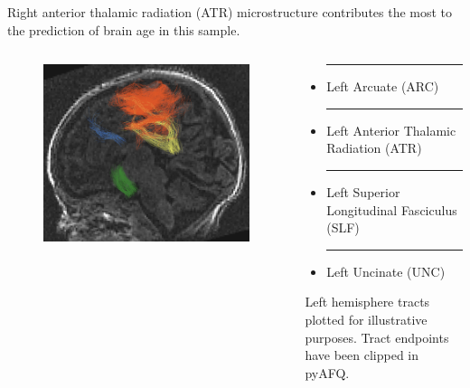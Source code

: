 \documentclass[final]{beamer}
\newlength{\colwidth}
\begin{document}
\begin{frame}[t]
\begin{columns}[t]
\begin{column}{\colwidth}
\begin{block}{Right anterior thalamic radiation (ATR) microstructure contributes the most to the prediction of brain age in this sample.}
    
    \begin{columns}[t] %
        \begin{column}{0.53\textwidth}
            \vspace{-10pt}
            \begin{figure} %
            \centering  \includegraphics[clip,width=\textwidth]{brain_2.png}
            \end{figure}
      \end{column}
    
      \begin{column}{0.46\textwidth}
        \vspace{-10pt}
        \begin{tcolorbox}[colback=gray!50, colframe=cardinalred, width=\linewidth]
          {\fontsize{9.5}{10}\selectfont
          \begin{itemize}
            \item \textcolor[rgb]{1.0, 1.0, 0.4}{\rule{0.8cm}{0.3cm}} Left Arcuate (ARC)
            \item \textcolor[rgb]{0.2, 0.4, 0.6}{\rule{0.8cm}{0.3cm}} Left Anterior Thalamic Radiation (ATR) 
            \item \textcolor[rgb]{1.0, 0.4, 0.0}{\rule{0.8cm}{0.3cm}} Left Superior Longitudinal Fasciculus (SLF) 
            \item \textcolor[rgb]{0.0, 0.6, 0.2}{\rule{0.8cm}{0.3cm}} Left Uncinate (UNC)
          \end{itemize}
          Left hemisphere tracts plotted for illustrative purposes. Tract endpoints have been clipped in pyAFQ.}
        \end{tcolorbox}
      \end{column}
    \end{columns}
    

\end{block}
\end{column}
\end{columns}
\end{frame}
\end{document}
